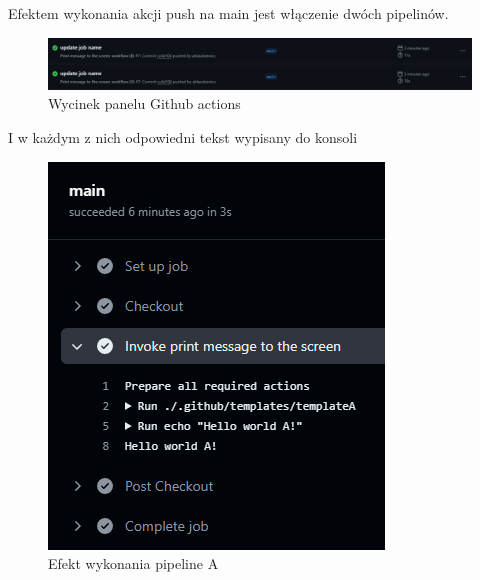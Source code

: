 \documentclass{article}
\begin{document}
Efektem wykonania akcji push na main jest włączenie dwóch pipelinów.

\begin{figure}[H]
    \centering
    \includegraphics[width=1\linewidth]{testPipelinesInGithubActionsDashboard.png}
    \caption{Wycinek panelu Github actions}
    \label{fig:enter-label}
\end{figure}

I w każdym z nich odpowiedni tekst wypisany do konsoli 

\begin{figure}[H]
    \centering
    \begin{minipage}[b]{0.45\textwidth}
        \centering
        \includegraphics[width=\linewidth]{testPipelinesPipelineA.png}
        \caption{Efekt wykonania pipeline A}
        \label{fig:enter-label-a}
    \end{minipage}
    \hfill
    \begin{minipage}[b]{0.45\textwidth}

\end{minipage}
\end{figure}
\end{document}
